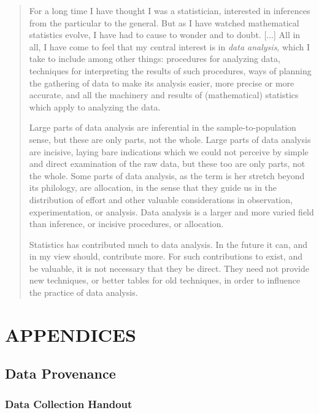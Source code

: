 \documentclass[]{article}
\begin{document}
\begin{quote}
For a long time I have thought I was a statistician, interested in inferences from the particular to the general.  But as I have watched mathematical statistics evolve, I have had to cause to wonder and to doubt. [...] All in all, I have come to feel that my central interest is in \emph{data analysis}, which I take to include among other things: procedures for analyzing data, techniques for interpreting the results of such procedures, ways of planning the gathering of data to make its analysis easier, more precise or more accurate, and all the machinery and results of (mathematical) statistics which apply to analyzing the data.

Large parts of data analysis are inferential in the sample-to-population sense, but these are only parts, not the whole.  Large parts of data analysis are incisive, laying bare indications which we could not perceive by simple and direct examination of the raw data, but these too are only parts, not the whole.  Some parts of data analysis, as the term is her stretch beyond its philology, are allocation, in the sense that they guide us in the distribution of effort and other valuable considerations in observation, experimentation, or analysis.  Data analysis is a larger and more varied field than inference, or incisive procedures, or allocation.

Statistics has contributed much to data analysis.  In the future it can, and in my view should, contribute more.  For such contributions to exist, and be valuable, it is not necessary that they be direct.  They need not provide new techniques, or better tables for old techniques, in order to influence the practice of data analysis.
\end{quote}

\newpage



\newpage

\newpage
\section{APPENDICES}
\label{sec:appendix}

\subsection{Data Provenance}
\label{sec:appendix-data-provenance}

\newpage
\subsubsection{Data Collection Handout}
\label{sec:appendix-data-handout}
\end{document}
